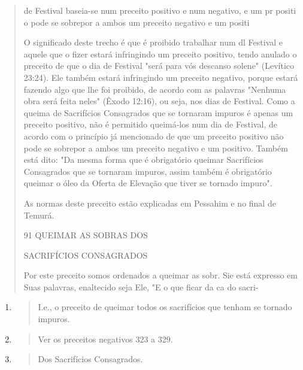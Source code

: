 \begin{quote}
de Festival baseia-se num preceito positivo e num negativo, e um pr
positi o pode se sobrepor a ambos um preceito negativo e um positi

O significado deste trecho é que é proibido trabalhar num dl Festival e
aquele que o fizer estará infringindo um preceito positivo, tendo
anu­lado o preceito de que o dia de Festival "será para vós descanso
solene" (Leví­tico 23:24). Ele também estará infringindo um preceito
negativo, porque estará fazendo algo que lhe foi proibido, de acordo com
as palavras "Nenhuma obra será feita neles" (Êxodo 12:16), ou seja, nos
dias de Festival. Como a queima de Sacrifícios Consagrados que se
tornaram impuros é apenas um preceito po­sitivo, não é permitido
queimá-los num dia de Festival, de acordo com o prin­cípio já mencionado
de que um preceito positivo não pode se sobrepor a am­bos um preceito
negativo e um positivo. Também está dito: "Da mesma forma que é
obrigatório queimar Sacrifícios Consagrados que se tornaram impuros,
assim também é obrigatório queimar o óleo da Oferta de Elevação que
tiver se tornado impuro".

As normas deste preceito estão explicadas em Pessahim e no final de
Temurá.

91 QUEIMAR AS SOBRAS DOS

SACRIFÍCIOS CONSAGRADOS

Por este preceito somos ordenados a queimar as sobr. Sie está expresso
em Suas palavras, enaltecido seja Ele, "E o que ficar da ca do sacri-
\end{quote}

\begin{enumerate}
\def\labelenumi{\arabic{enumi}.}
\setcounter{enumi}{118}
\item
  \begin{quote}
  I.e., o preceito de queimar todos os sacrifícios que tenham se tornado
  impuros.
  \end{quote}
\item
  \begin{quote}
  Ver os preceitos negativos 323 a 329.
  \end{quote}
\item
  \begin{quote}
  Dos Sacrifícios Consagrados.
  \end{quote}
\end{enumerate}

